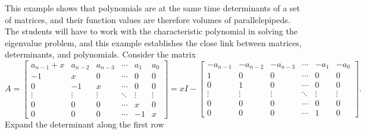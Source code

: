 \documentclass[10pt]{article}
\begin{document}
This example shows that polynomials are at the same time determinants of a set of matrices, and their function values are therefore volumes of parallelepipeds. The students will have to work with the characteristic polynomial in solving the eigenvalue problem, and this example establishes the close link between matrices, determinants, and polynomials. Consider the matrix
{\tiny
\[
A = \left[\begin{array}{cccccc}
a_{n-1}+x & a_{n-2} & a_{n-3} & \cdots & a_1 & a_0 \\
-1 & x & 0 & \cdots & 0 & 0 \\
0 & -1 & x & \cdots & 0 & 0 \\
\vdots & \vdots & \vdots & \ddots & \vdots & \vdots \\
0 & 0 & 0 & \cdots & x & 0 \\
0 & 0 & 0 & \cdots & -1 & x
\end{array}\right] = x I - \left[\begin{array}{cccccc}
-a_{n-1} & -a_{n-2} & -a_{n-3} & \cdots & -a_1 & -a_0 \\
1 & 0 & 0 & \cdots & 0 & 0 \\
0 & 1 & 0 & \cdots & 0 & 0 \\
\vdots & \vdots & \vdots & \ddots & \vdots & \vdots \\
0 & 0 & 0 & \cdots & 0 & 0 \\
0 & 0 & 0 & \cdots & 1 & 0
\end{array}\right].
\]
}
Expand the determinant along the first row
\end{document}
